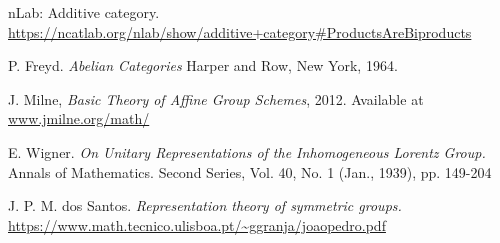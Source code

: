 \documentclass[a4paper,10pt]{scrreprt}
\theoremstyle{definition}
\theoremstyle{plain}
\theoremstyle{remark}
\begin{document}
\begin{thebibliography}{9}
   nLab: Additive category.
    \url{https://ncatlab.org/nlab/show/additive+category#ProductsAreBiproducts}

   P. Freyd.
    \textit{Abelian Categories}
    Harper and Row, New York, 1964.

   J. Milne,
    \textit{Basic Theory of Affine Group Schemes},
    2012. 
    Available at \url{www.jmilne.org/math/}

   E. Wigner.
    \textit{On Unitary Representations of the Inhomogeneous Lorentz Group.}
    Annals of Mathematics. Second Series, Vol. 40, No. 1 (Jan., 1939), pp. 149-204

   J. P. M. dos Santos.
    \emph{Representation theory of symmetric groups.}
    \url{https://www.math.tecnico.ulisboa.pt/~ggranja/joaopedro.pdf}
\end{thebibliography}
\end{document}
